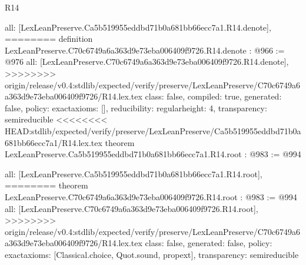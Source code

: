 \begin{lexlean}{R14}
\begin{coremodule}
{{{{{{{{{{{{  all: [LexLeanPreserve.Ca5b519955eddbd71b0a681bb66ecc7a1.R14.denote],
========
definition LexLeanPreserve.C70c6749a6a363d9e73eba006409f9726.R14.denote : @966 := @976 {
  all: [LexLeanPreserve.C70c6749a6a363d9e73eba006409f9726.R14.denote],
>>>>>>>> origin/release/v0.4:stdlib/expected/verify/preserve/LexLeanPreserve/C70c6749a6a363d9e73eba006409f9726/R14.lex.tex
  class: false,
  compiled: true,
  generated: false,
  policy: exact{axioms: []},
  reducibility: regular{height: 4},
  transparency: semireducible
}
<<<<<<<< HEAD:stdlib/expected/verify/preserve/LexLeanPreserve/Ca5b519955eddbd71b0a681bb66ecc7a1/R14.lex.tex
theorem LexLeanPreserve.Ca5b519955eddbd71b0a681bb66ecc7a1.R14.root : @983 := @994 {
  all: [LexLeanPreserve.Ca5b519955eddbd71b0a681bb66ecc7a1.R14.root],
========
theorem LexLeanPreserve.C70c6749a6a363d9e73eba006409f9726.R14.root : @983 := @994 {
  all: [LexLeanPreserve.C70c6749a6a363d9e73eba006409f9726.R14.root],
>>>>>>>> origin/release/v0.4:stdlib/expected/verify/preserve/LexLeanPreserve/C70c6749a6a363d9e73eba006409f9726/R14.lex.tex
  class: false,
  generated: false,
  policy: exact{axioms: [Classical.choice, Quot.sound, propext]},
  transparency: semireducible
}

}}}}}}}}}}}}}
\end{coremodule}
\end{lexlean}
